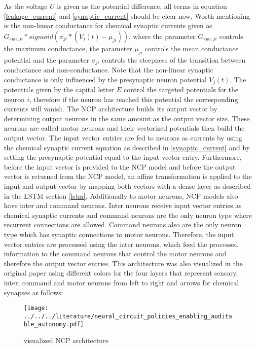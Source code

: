 \documentclass[draft,final]{vutinfth} %
\begin{document}
    As the voltage $U$ is given as the potential difference, all terms in equation \ref{leakage_current} and \ref{synaptic_current} should be clear now.
    Worth mentioning is the non-linear conductance for chemical synaptic currents given as $G_{syn,ji} * sigmoid(\sigma_{ji}*(V_j(t)-\mu_{ji}))$, where the parameter $G_{syn,ji}$ controls the maximum conductance, the parameter $\mu_{ji}$ controls the mean conductance potential and the parameter $\sigma_{ji}$ controls the steepness of the transition between conductance and non-conductance.
    Note that the non-linear synaptic conductance is only influenced by the presynaptic neuron potential $V_j(t)$.
    The potentials given by the capital letter $E$ control the targeted potentials for the neuron $i$, therefore if the neuron has reached this potential the corresponding currents will vanish. 
    The NCP architecture builds its output vector by determining output neurons in the same amount as the output vector size.
    These neurons are called motor neurons and their vectorized potentials then build the output vector.
    The input vector entries are fed to neurons as currents by using the chemical synaptic current equation as described in \ref{synaptic_current} and by setting the presynaptic potential equal to the input vector entry.
    Furthermore, before the input vector is provided to the NCP model and before the output vector is returned from the NCP model, an affine transformation is applied to the input and output vector by mapping both vectors with a dense layer as described in the LSTM section \ref{lstm}.
    Additionally to motor neurons, NCP models also have inter and command neurons.
    Inter neurons receive input vector entries as chemical synaptic currents and command neurons are the only neuron type where recurrent connections are allowed.
    Command neurons also are the only neuron type which has synaptic connections to motor neurons.
    Therefore, the input vector entries are processed using the inter neurons, which feed the processed information to the command neurons that control the motor neurons and therefore the output vector entries.
    This architecture was also visualized in the original paper using different colors for the four layers that represent sensory, inter, command and motor neurons from left to right and arrows for chemical synapses as follows:
    \begin{figure}[H]
        \centering{}
        \texttt{[image: ../../../literature/neural\_circuit\_policies\_enabling\_auditable\_autonomy.pdf]}
        \caption{visualized NCP architecture \cite[p. 3]{NCP}}
        \label{fig:ncp_vis}
    \end{figure}
\end{document}
